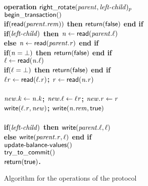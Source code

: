\begin{figure}[h!]
{{\begin{minipage}[t]{150mm}
\begin{tabbing}
		
\bf{operation} $\act{right\_rotate}(\ms{parent}, \ms{left-child})_p$ \\
		 \> $\lit{begin\_transaction}()$ \\
		 \> \bf{if}$(\lit{read}(\ms{parent.rem}))$ \bf{then} $\sf{return}(\lit{false})$ \bf{end if} \label{line:rot-par-rem} \\
		 \> \bf{if}$(\ms{left-child})$ \bf{then} $\ms{n} \gets \lit{read}(\ms{parent.\ell})$ \\
		 \>\> \bf{else} $\ms{n} \gets \lit{read}(\ms{parent.r})$ {\bf end if} \\
		 \> \bf{if}$(\ms{n = \bot})$ \bf{then} $\sf{return}(\lit{false})$ \bf{end if} \\
		 \> $\ms{\ell} \gets \lit{read}(\ms{n.\ell})$ \\
		 \> \bf{if}$(\ms{\ell = \bot})$ \bf{then} $\sf{return}(\lit{false})$ \bf{end if} \label{line:l-child-rot} \\
		 \> $\ms{\ell{}r} \gets \lit{read}(\ms{\ell.r})$; $\ms{r} \gets \lit{read}(\ms{n.r})$ \\
		 \> \label{line:new-node-ret} \\
		 \> $\ms{new.k} \gets \ms{n.k}$; $\ms{new.\ell} \gets \ms{\ell{}r}$; $\ms{new.r} \gets \ms{r}$ \label{line:rot-path1} \label{line:rot-path2} \\
		 \> $\lit{write}(\ms{\ell.r}, \ms{new})$; $\lit{write}(\ms{n.rem}, \lit{true})$ \label{line:rot-path3} \label{line:rem-rot} \\
		 \>  \\
		 \> \bf{if}$(\ms{left-child})$ \bf{then} $\lit{write}(\ms{parent.\ell}, \ms{\ell})$ \label{line:rot-write} \\
		 \> \bf{else} $\lit{write}(\ms{parent.r}, \ms{\ell})$ \bf{end if} \label{line:rot-end} \\
		 \> $\act{update-balance-values()}$ \label{line:u-b-v4} \\
		 \> $\lit{try\_to\_commit}()$ \\
		 \> $\sf{return}(\lit{true})$. \\
		
		

\end{tabbing}
\normalsize
\end{minipage}
}
\caption{Algorithm for the operations of the protocol}
\label{fig:ttc-protocol}
}
\end{figure}
